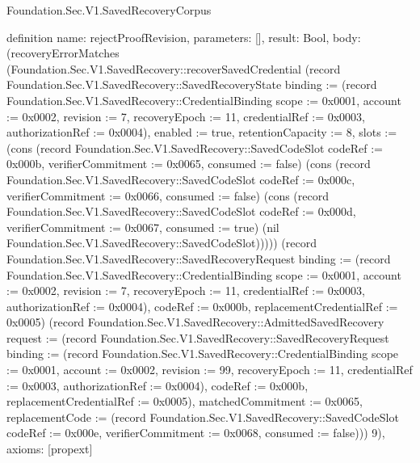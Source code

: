 \begin{lexlean}{Foundation.Sec.V1.SavedRecoveryCorpus}
\begin{semanticmodule}
definition{
  name: rejectProofRevision,
  parameters: [],
  result: Bool,
  body: (recoveryErrorMatches (Foundation.Sec.V1.SavedRecovery::recoverSavedCredential (record Foundation.Sec.V1.SavedRecovery::SavedRecoveryState {binding := (record Foundation.Sec.V1.SavedRecovery::CredentialBinding {scope := 0x0001, account := 0x0002, revision := 7, recoveryEpoch := 11, credentialRef := 0x0003, authorizationRef := 0x0004}), enabled := true, retentionCapacity := 8, slots := (cons (record Foundation.Sec.V1.SavedRecovery::SavedCodeSlot {codeRef := 0x000b, verifierCommitment := 0x0065, consumed := false}) (cons (record Foundation.Sec.V1.SavedRecovery::SavedCodeSlot {codeRef := 0x000c, verifierCommitment := 0x0066, consumed := false}) (cons (record Foundation.Sec.V1.SavedRecovery::SavedCodeSlot {codeRef := 0x000d, verifierCommitment := 0x0067, consumed := true}) (nil Foundation.Sec.V1.SavedRecovery::SavedCodeSlot))))}) (record Foundation.Sec.V1.SavedRecovery::SavedRecoveryRequest {binding := (record Foundation.Sec.V1.SavedRecovery::CredentialBinding {scope := 0x0001, account := 0x0002, revision := 7, recoveryEpoch := 11, credentialRef := 0x0003, authorizationRef := 0x0004}), codeRef := 0x000b, replacementCredentialRef := 0x0005}) (record Foundation.Sec.V1.SavedRecovery::AdmittedSavedRecovery {request := (record Foundation.Sec.V1.SavedRecovery::SavedRecoveryRequest {binding := (record Foundation.Sec.V1.SavedRecovery::CredentialBinding {scope := 0x0001, account := 0x0002, revision := 99, recoveryEpoch := 11, credentialRef := 0x0003, authorizationRef := 0x0004}), codeRef := 0x000b, replacementCredentialRef := 0x0005}), matchedCommitment := 0x0065, replacementCode := (record Foundation.Sec.V1.SavedRecovery::SavedCodeSlot {codeRef := 0x000e, verifierCommitment := 0x0068, consumed := false})})) 9),
  axioms: [propext]
}


\end{semanticmodule}
\end{lexlean}
